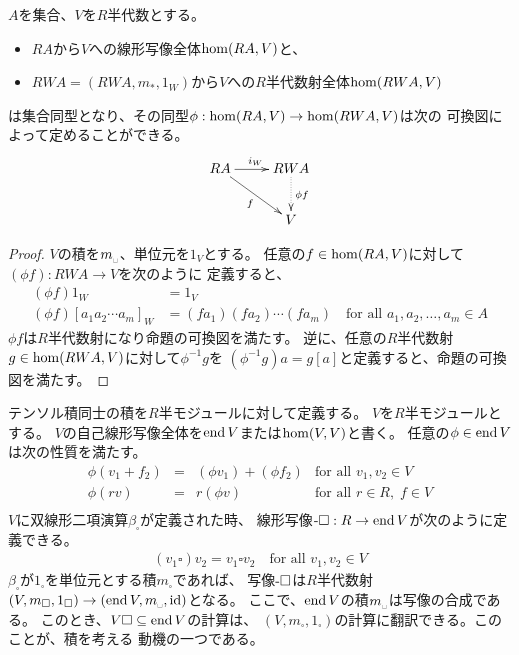 	\begin{proposition}[自由半代数の普遍性]\label{prop:自由半代数の普遍性} %
		$A$を集合、$V$を$R$半代数とする。
		\begin{itemize}\setlength{\itemsep}{-1mm} %
			\item $RA$から$V$への線形写像全体$\operatorname{hom}(RA,V)$と、
			\item $RWA=(RWA,m_*,1_W)$から$V$への$R$半代数射全体$\operatorname{hom}(RWA,V)$
		\end{itemize} %
		は集合同型となり、その同型$\phi:\operatorname{hom}(RA,V)\to\operatorname{hom}(RWA,V)$は次の
		可換図によって定めることができる。
		\begin{equation*}\xymatrix{
			RA \ar[r]^{i_W} \ar[rd]_{f} & RWA \ar@{.>}[d]^{\phi f} \\
			& V \\
		}\end{equation*}
	\end{proposition} %
	\begin{proof} %
		$V$の積を$m_\myspace$、単位元を$1_V$とする。
		任意の$f\in\operatorname{hom}(RA,V)$に対して$(\phi f):RWA\to V$を次のように
		定義すると、
		\begin{equation*}\begin{split} %
			(\phi f)1_W &= 1_V \\
			(\phi f)[a_1a_2\cdots a_m]_W &= (fa_1)(fa_2)\cdots(fa_m)
			\quad\text{for all }a_1,a_2,\dots,a_m\in A
		\end{split}\end{equation*} %
		$\phi f$は$R$半代数射になり命題の可換図を満たす。
		逆に、任意の$R$半代数射$g\in\operatorname{hom}(RWA,V)$に対して$\phi^{-1}g$を
		$(\phi^{-1}g)a=g[a]$と定義すると、命題の可換図を満たす。
	\end{proof} %

	テンソル積同士の積を$R$半モジュールに対して定義する。
	$V$を$R$半モジュールとする。
	$V$の自己線形写像全体を$\operatorname{end}V$または$\operatorname{hom}(V,V)$と書く。
	任意の$\phi\in\operatorname{end}V$は次の性質を満たす。
	\begin{equation*}\begin{array}{rcll} %
		\phi(v_1+f_2) &=& (\phi v_1) + (\phi f_2)
			&\text{for all } v_1,v_2\in V \\
		\phi(rv) &=& r(\phi v) &\text{for all }r\in R,\;f\in V \\
	\end{array}\end{equation*} %
	$V$に双線形二項演算$\beta_\square$が定義された時、
	線形写像$\myhere\square:R\to\myop{end}V$が次のように定義できる。
	\begin{equation*}\begin{split} %
		(v_1\square)v_2 = v_1\square v_2 \quad\text{for all } v_1,v_2\in V
	\end{split}\end{equation*} %
	$\beta_\square$が$1_\square$を単位元とする積$m_\square$であれば、
	写像$\myhere\square$は$R$半代数射
	$(V,m_\square,1_\square)\to(\myop{end}V,m_\myspace,\myid)$となる。
	ここで、$\operatorname{end}V$の積$m_\myspace$は写像の合成である。
	このとき、$V\square\subseteq\operatorname{end}V$の計算は、
	$(V,m_\square,1_\square)$の計算に翻訳できる。このことが、積を考える
	動機の一つである。

